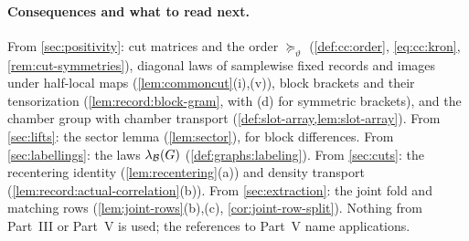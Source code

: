 \paragraph{Consequences and what to read next.}
From \cref{sec:positivity}: cut matrices and the order $\succeq_\vartheta$
(\cref{def:cc:order}, \eqref{eq:cc:kron}, \cref{rem:cut-symmetries}), diagonal
laws of samplewise fixed records and images under half-local maps
(\cref{lem:commoncut}(i),(v)), block brackets and their tensorization
(\cref{lem:record:block-gram}, with (d) for symmetric brackets), and the chamber
group with chamber transport (\cref{def:slot-array,lem:slot-array}). From
\cref{sec:lifts}: the sector lemma (\cref{lem:sector}), for block differences.
From \cref{sec:labellings}: the laws $\lambda_{\mathcal B}(G)$
(\cref{def:graphs:labeling}). From \cref{sec:cuts}: the recentering identity
(\cref{lem:recentering}(a)) and density transport
(\cref{lem:record:actual-correlation}(b)). From \cref{sec:extraction}: the joint fold and
matching rows (\cref{lem:joint-rows}(b),(c), \cref{cor:joint-row-split}).
Nothing from Part~III or Part~V is used; the references to Part~V name
applications.
